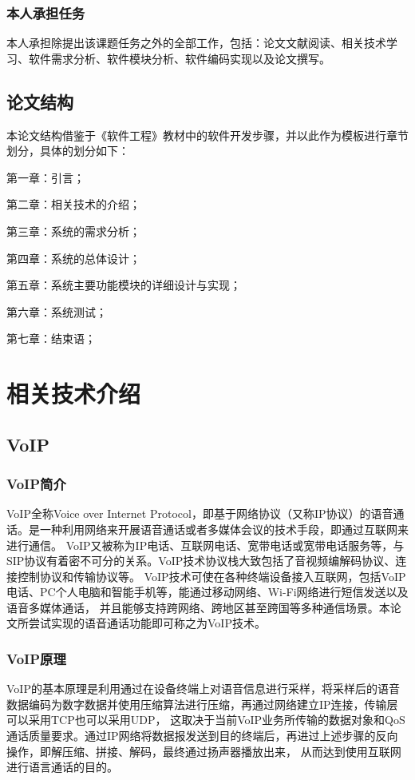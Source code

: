 \documentclass[a4paper,AutoFakeBold,oneside,12pt]{book}
\begin{document}
\subsection{本人承担任务}
本人承担除提出该课题任务之外的全部工作，包括：论文文献阅读、相关技术学习、软件需求分析、软件模块分析、软件编码实现以及论文撰写。
\newpage
\section{论文结构}
本论文结构借鉴于《软件工程》教材中的软件开发步骤，并以此作为模板进行章节划分，具体的划分如下：

第一章：引言；

第二章：相关技术的介绍；

第三章：系统的需求分析；

第四章：系统的总体设计；

第五章：系统主要功能模块的详细设计与实现；

第六章：系统测试；

第七章：结束语；
\chapter{相关技术介绍}
\section{VoIP}
\subsection{VoIP简介}
VoIP全称Voice over Internet Protocol，即基于网络协议（又称IP协议）的语音通话。是一种利用网络来开展语音通话或者多媒体会议的技术手段，即通过互联网来进行通信。
VoIP又被称为IP电话、互联网电话、宽带电话或宽带电话服务等，与SIP协议有着密不可分的关系。VoIP技术协议栈大致包括了音视频编解码协议、连接控制协议和传输协议等。
VoIP技术可使在各种终端设备接入互联网，包括VoIP电话、PC个人电脑和智能手机等，能通过移动网络、Wi-Fi网络进行短信发送以及语音多媒体通话，
并且能够支持跨网络、跨地区甚至跨国等多种通信场景。本论文所尝试实现的语音通话功能即可称之为VoIP技术。
\subsection{VoIP原理}
VoIP的基本原理是利用通过在设备终端上对语音信息进行采样，将采样后的语音数据编码为数字数据并使用压缩算法进行压缩，再通过网络建立IP连接，传输层可以采用TCP也可以采用UDP，
这取决于当前VoIP业务所传输的数据对象和QoS通话质量要求。通过IP网络将数据报发送到目的终端后，再进过上述步骤的反向操作，即解压缩、拼接、解码，最终通过扬声器播放出来，
从而达到使用互联网进行语言通话的目的。
\end{document}
